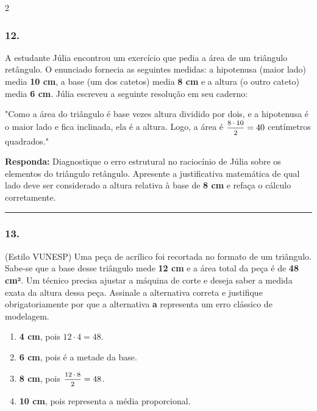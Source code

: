 \documentclass[twoside, 10pt, a4paper]{article}
\newlength{\espacoPreQuestao}\setlength{\espacoPreQuestao}{0.1cm}
\newlength{\espacoQuestao}\setlength{\espacoQuestao}{0.2cm}
\newlength{\espacoAlt}\setlength{\espacoAlt}{0.2cm}
\begin{document}
\begin{multicols*}{2}
\subsubsection*{12.} A estudante Júlia encontrou um exercício que pedia a área de um triângulo retângulo. O enunciado fornecia as seguintes medidas: a hipotenusa (maior lado) media \textbf{10 cm}, a base (um dos catetos) media \textbf{8 cm} e a altura (o outro cateto) media \textbf{6 cm}. Júlia escreveu a seguinte resolução em seu caderno:
\par
"Como a área do triângulo é base vezes altura dividido por dois, e a hipotenusa é o maior lado e fica inclinada, ela é a altura. Logo, a área é $ \mfrac{8 \cdot 10}{2} = 40 $ centímetros quadrados."
\begin{boxresponda}
\textbf{Responda:} Diagnostique o erro estrutural no raciocínio de Júlia sobre os elementos do triângulo retângulo. Apresente a justificativa matemática de qual lado deve ser considerado a altura relativa à base de \textbf{8 cm} e refaça o cálculo corretamente.
\end{boxresponda}
\par\vspace{\espacoQuestao}

\noindent\textcolor{CorLinha}{\rule{\linewidth}{0.5pt}} 
\par\vspace{\espacoPreQuestao}
\subsubsection*{13.} (Estilo VUNESP) Uma peça de acrílico foi recortada no formato de um triângulo. Sabe-se que a base desse triângulo mede \textbf{12 cm} e a área total da peça é de \textbf{48 cm²}. Um técnico precisa ajustar a máquina de corte e deseja saber a medida exata da altura dessa peça. Assinale a alternativa correta e justifique obrigatoriamente por que a alternativa \textbf{a} representa um erro clássico de modelagem.

\begin{enumerate}[label=\alph*), itemsep=\espacoAlt]
\item \textbf{4 cm}, pois $ 12 \cdot 4 = 48 $.
\item \textbf{6 cm}, pois é a metade da base.
\item \textbf{8 cm}, pois $ \mfrac{12 \cdot 8}{2} = 48 $.
\item \textbf{10 cm}, pois representa a média proporcional.
\end{enumerate}
\par\vspace{\espacoQuestao}


\end{multicols*}
\end{document}
